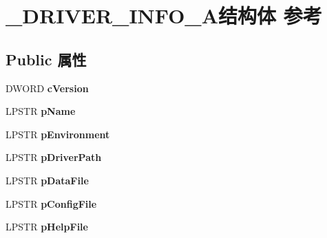\hypertarget{struct___d_r_i_v_e_r___i_n_f_o__6_a}{}\section{\+\_\+\+D\+R\+I\+V\+E\+R\+\_\+\+I\+N\+F\+O\+\_\+A结构体 参考}
\label{struct___d_r_i_v_e_r___i_n_f_o__6_a}
\subsection*{Public 属性}
\begin{DoxyCompactItemize}
\item 
\mbox{\label{struct___d_r_i_v_e_r___i_n_f_o__6_a_a881d0b3c78b29b6012e78e08e1a626af}} 
D\+W\+O\+RD {\bfseries c\+Version}
\item 
\mbox{\label{struct___d_r_i_v_e_r___i_n_f_o__6_a_ac9bba840100551a765d92549205001ad}} 
L\+P\+S\+TR {\bfseries p\+Name}
\item 
\mbox{\label{struct___d_r_i_v_e_r___i_n_f_o__6_a_ae2ecdc5911cc526de8ce52cf61bd1230}} 
L\+P\+S\+TR {\bfseries p\+Environment}
\item 
\mbox{\label{struct___d_r_i_v_e_r___i_n_f_o__6_a_af31839bd7777444dba139b05348d92fc}} 
L\+P\+S\+TR {\bfseries p\+Driver\+Path}
\item 
\mbox{\label{struct___d_r_i_v_e_r___i_n_f_o__6_a_ab98449d71f2cafca745803b8c2652763}} 
L\+P\+S\+TR {\bfseries p\+Data\+File}
\item 
\mbox{\label{struct___d_r_i_v_e_r___i_n_f_o__6_a_a852f5198703919e8a308163854c62eed}} 
L\+P\+S\+TR {\bfseries p\+Config\+File}
\item 
\mbox{\label{struct___d_r_i_v_e_r___i_n_f_o__6_a_a34b76c253cca7c8697246abbe0991b27}} 
L\+P\+S\+TR {\bfseries p\+Help\+File}
\item 
\mbox{\label{struct___d_r_i_v_e_r___i_n_f_o__6_a_a9e62677f89d3389bc99d7b5ca7eed9c0}} 

\end{DoxyCompactItemize}
